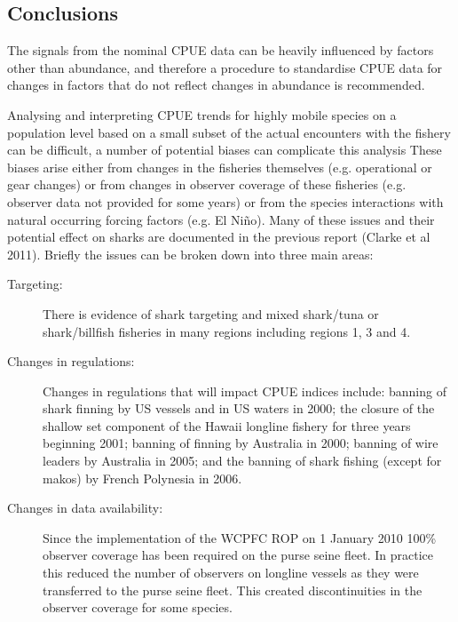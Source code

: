       


      



\subsection{Conclusions}

The signals from the nominal  CPUE data can be heavily influenced by factors other than abundance, and therefore a procedure to standardise CPUE data for changes in factors  that do not reflect changes in abundance is recommended. 

 
Analysing and interpreting CPUE trends for highly mobile species on a population level based on a small subset of the actual encounters with the fishery can be difficult, a number of potential biases can complicate this analysis   These biases arise either from changes in the fisheries themselves (e.g. operational or gear changes) or from changes in observer coverage of these fisheries (e.g. observer data not provided for some years) or from the species interactions with natural occurring forcing factors (e.g. El Ni\~no). Many of these issues and their potential effect on sharks are documented in the previous report (Clarke et al 2011).  %
Briefly the issues can be broken down into three main areas:
\begin{description}
\item[Targeting:] There is evidence of shark targeting and mixed shark/tuna or shark/billfish fisheries in many regions including regions 1, 3 and 4. 
\item[Changes in regulations:] Changes in regulations that will impact CPUE indices include: banning of shark finning by US vessels and in US waters in 2000; the closure of the shallow set component of the Hawaii longline fishery for three years beginning 2001; banning of  finning by Australia in 2000; banning of wire leaders by Australia in 2005; and the banning of shark fishing (except for makos) by French Polynesia in 2006.
\item[Changes in data availability:] Since the implementation of the WCPFC ROP on 1 January 2010 100\% observer coverage has been required on the purse seine fleet. In practice this reduced the number of observers on longline vessels as they were transferred to the purse seine fleet. This created discontinuities in the observer coverage for some species.
\end{description}


